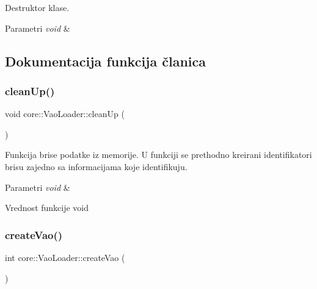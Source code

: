 Destruktor klase. 


\begin{DoxyParams}{Parametri}
{\em void} & \\
\hline
\end{DoxyParams}


\subsection{Dokumentacija funkcija članica}
\mbox{\label{classcore_1_1VaoLoader_a15a5ec23ffe560ad7117980aaf0d97b9}} 
\subsubsection{\texorpdfstring{clean\+Up()}{cleanUp()}}
{\footnotesize\ttfamily void core\+::\+Vao\+Loader\+::clean\+Up (\begin{DoxyParamCaption}\item[{void}]{ }\end{DoxyParamCaption})}



Funkcija brise podatke iz memorije. U funkciji se prethodno kreirani identifikatori brisu zajedno sa informacijama koje identifikuju. 


\begin{DoxyParams}{Parametri}
{\em void} & \\
\hline
\end{DoxyParams}
\begin{DoxyReturn}{Vrednost funkcije}
void 
\end{DoxyReturn}
\mbox{\label{classcore_1_1VaoLoader_af76598a15d38378e594778d9a63a7a6a}} 
\subsubsection{\texorpdfstring{create\+Vao()}{createVao()}}
{\footnotesize\ttfamily int core\+::\+Vao\+Loader\+::create\+Vao (\begin{DoxyParamCaption}\item[{void}]{ }\end{DoxyParamCaption})\hspace{0.3cm}{\ttfamily [private]}}



